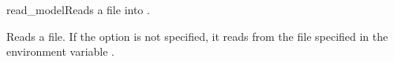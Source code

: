 \begin{nusmvCommand}{read\_model}{Reads a \nusmvhead file into
    \nusmvhead.}


Reads a \tool file. If the  option is not specified, it
reads from the file specified in the environment variable
.\\

\begin{cmdOpt}
\end{cmdOpt}

\end{nusmvCommand}
